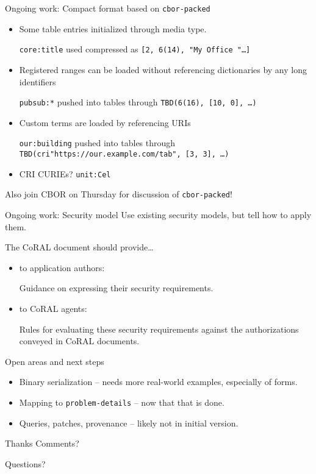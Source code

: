 \documentclass[aspectratio=169,colorlinks]{beamer}
\begin{document}
\begin{frame}{Ongoing work: Compact format based on \texttt{cbor-packed}}\Large

	\begin{itemize}
		\item Some table entries initialized through media type.
		
			\texttt{\color{darkgreen}core:title} used compressed as
			\texttt{[2, {\color{darkgreen}6(14)}, "My Office "\ldots]}

		\item Registered ranges can be loaded without referencing dictionaries by any long identifiers

			\texttt{\color{blue}pubsub:*} pushed into tables through \texttt{TBD({\color{darkgreen}6(16)}, [10, 0], \ldots)}

		\item Custom terms are loaded by referencing URIs

			\texttt{\color{red}our:building} pushed into tables through \texttt{TBD(cri"https://our.example.com/tab", [3, 3], \ldots)}

		\item CRI CURIEs? \texttt{\color{magenta}unit:Cel}
	\end{itemize}

	\bigskip

	\footnotesize{Also join CBOR on Thursday for discussion of \texttt{cbor-packed}!}
\end{frame}

\begin{frame}{Ongoing work: Security model}\Large
	Use existing security models, but tell how to apply them.

	The CoRAL document should provide\ldots

	\begin{itemize}
		\item to application authors:

			Guidance on expressing their security requirements.

		\item to CoRAL agents:

			Rules for evaluating these security requirements against the authorizations conveyed in CoRAL documents.
	\end{itemize}
\end{frame}

\begin{frame}{Open areas and next steps}\Large
	\begin{itemize}
		\item Binary serialization -- needs more real-world examples, especially of forms.
		\item Mapping to \texttt{problem-details} -- now that that is done.
		\item Queries, patches, provenance -- likely not in initial version.
	\end{itemize}
\end{frame}

\begin{frame}{Thanks}\Large
	Comments?

	\bigskip

	Questions?
\end{frame}
\end{document}
